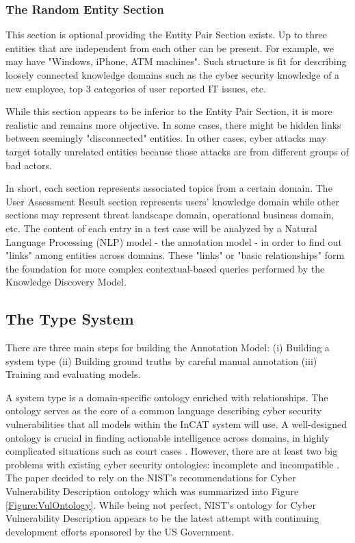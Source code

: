 \documentclass[conference]{IEEEtran}
\begin{document}
\subsubsection{The Random Entity Section}
This section is optional providing the Entity Pair Section exists. Up to three entities that are independent from each other can be present. For example, we may have "Windows, iPhone, ATM machines". Such structure is fit for describing loosely connected knowledge domains such as the cyber security knowledge of a new employee, top 3 categories of user reported IT issues, etc.

While this section appears to be inferior to the Entity Pair Section, it is more realistic and remains more objective. In some cases, there might be hidden links between seemingly "disconnected" entities. In other cases, cyber attacks may target totally unrelated entities because those attacks are from different groups of bad actors.

In short, each section represents associated topics from a certain domain. The User Assessment Result section represents users' knowledge domain while other sections may represent threat landscape domain, operational business domain, etc. The content of each entry in a test case will be analyzed by a Natural Language Processing (NLP) model - the annotation model - in order to find out "links" among entities across domains. These "links" or "basic relationships" form the foundation for more complex contextual-based queries performed by the Knowledge Discovery Model.


\subsection{The Type System}
There are three main steps for building the Annotation Model: (i) Building a system type (ii) Building ground truths by careful manual annotation (iii) Training and evaluating models.

A system type is a domain-specific ontology enriched with relationships. The ontology serves as the core of a common language describing cyber security vulnerabilities that all models within the InCAT system will use. A well-designed ontology is crucial in finding actionable intelligence across domains, in highly complicated situations such as court cases \cite{Michel2018CyberCybercrime}. However, there are at least two big problems with existing cyber security ontologies: incomplete and incompatible \cite{Mavroeidis2017CyberIntelligence}. The paper decided to rely on the NIST's recommendations for Cyber Vulnerability Description ontology \cite{Booth2016DraftOntology} which was summarized into Figure \ref{Figure:VulOntology}. While being not perfect, NIST's ontology for Cyber Vulnerability Description appears to be the latest attempt with continuing development efforts sponsored by the US Government.
\end{document}
